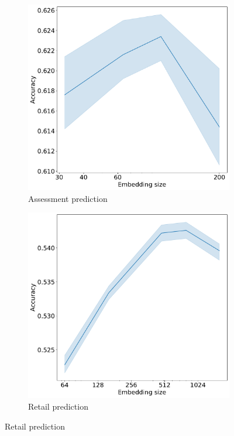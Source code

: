 \documentclass{article}
\begin{document}
\begin{figure}
\begin{subfigure}{0.5\linewidth}
  \end{subfigure}
  \begin{subfigure}{0.5\linewidth}
    \caption{Assessment prediction}
    \includegraphics[width=\linewidth]{figures/bowl-hidden-size.pdf}
  \end{subfigure}%
  \begin{subfigure}{0.5\linewidth}
    \caption{Retail prediction}
    \includegraphics[width=\linewidth]{figures/x5-hidden-size.pdf}
  \end{subfigure}
  \label{fig-emb-dim}
\end{figure}
\end{document}
